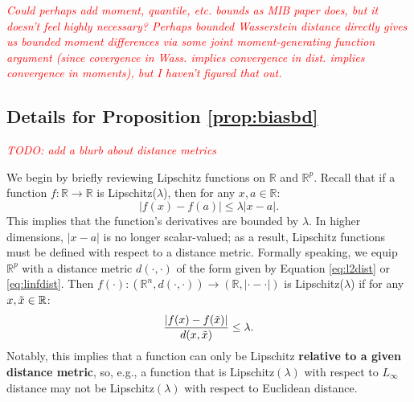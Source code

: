 \documentclass{article}
\newcommand{\R}{\mathbb{R}}
\newcommand{\Rp}{\mathbb{R}^p}
\newcommand{\note}[1]{\textcolor{red}{\textit{#1}}}
\begin{document}
\note{Could perhaps add moment, quantile, etc. bounds as MIB paper does, but it doesn't feel highly necessary?
Perhaps bounded Wasserstein distance directly gives us bounded moment differences via some joint moment-generating function argument (since covergence in Wass. implies convergence in dist. implies convergence in moments), but I haven't figured that out.}


\subsection{Details for Proposition \ref{prop:biasbd}}
\label{app:biasbd}

\note{TODO: add a blurb about distance metrics}

We begin by briefly reviewing Lipschitz functions on $\mathbb{R}$ and $\mathbb{R}^p$.
Recall that if a function $f: \mathbb{R} \to \mathbb{R}$ is Lipschitz($\lambda$), then for any $x, a \in \R$:
\begin{equation*}
    |f(x) - f(a)| \leq \lambda |x-a|.
\end{equation*}
This implies that the function's derivatives are bounded by $\lambda$.
In higher dimensions, $|x-a|$ is no longer scalar-valued;
as a result, Lipschitz functions must be defined with respect to a distance metric.
Formally speaking, we equip $\Rp$ with a distance metric $d(\cdot, \cdot)$ of the form given by Equation \ref{eq:l2dist} or \ref{eq:linfdist}.
Then $f(\cdot): (\mathbb{R}^n, d(\cdot, \cdot)) \to (\mathbb{R}, |\cdot - \cdot|)$ is Lipschitz($\lambda$) if for any $x, \Tilde{x} \in \R$:
\begin{equation*}
    \frac{|f(x) - f(\Tilde{x})|}{d(x, \Tilde{x})} \leq \lambda.
\end{equation*}
Notably, this implies that a function can only be Lipschitz \textbf{relative to a given distance metric},
so, e.g., a function that is Lipschitz$(\lambda)$ with respect to $L_\infty$ distance may not be Lipschitz$(\lambda)$ with respect to Euclidean distance.
\end{document}
